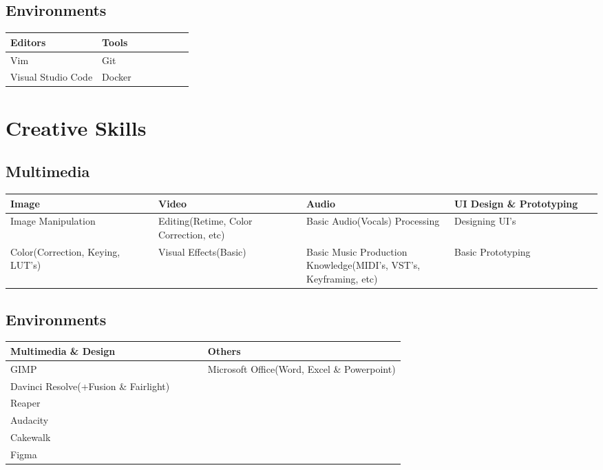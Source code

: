 \documentclass{article}
\newcommand{\quarterwidth}{0.25\linewidth}
\newcommand{\halfwidth}{0.50\linewidth}
\begin{document}
		\subsection{Environments}
			\begin{table}[h!]
				\begin{tabular}[c]{|p{\halfwidth}|p{\halfwidth}|}
					\toprule
					\textbf{Editors}	&	\textbf{Tools}	\\
					\midrule
					Vim					&	Git				\\
					Visual Studio Code	&	Docker			\\
					\bottomrule
				\end{tabular}
			\end{table}

	\section{Creative Skills}
		\subsection{Multimedia}
			\begin{table}[h!]
				\begin{tabular}[c]{|p{\quarterwidth}|p{\quarterwidth}|p{\quarterwidth}|p{\quarterwidth}|}
					\toprule
					\textbf{Image} 						& 	\textbf{Video} 							& \textbf{Audio} 														& \textbf{UI Design \newline\& Prototyping}		\\
					\midrule
					Image Manipulation					&	Editing(Retime, Color Correction, etc)	&	Basic Audio(Vocals) Processing										&	Designing UI's		\\
					Color(Correction, Keying, LUT's)	&   Visual Effects(Basic)					&   Basic Music Production Knowledge(MIDI's, VST's, Keyframing, etc)	&   Basic Prototyping	\\
					\bottomrule
				\end{tabular}
			\end{table}
		\subsection{Environments}
			\begin{table}[h!]
				\begin{tabular}[c]{|p{\halfwidth}|p{\halfwidth}|}
					\toprule
					\textbf{Multimedia \& Design}			& 	\textbf{Others}		\\
					\midrule
					GIMP									&	Microsoft Office(Word, Excel \& Powerpoint) \\
					Davinci Resolve(+Fusion \& Fairlight)	&					\\
					Reaper									&					\\
					Audacity								&					\\
					Cakewalk								&					\\
					Figma									&					\\
					\bottomrule
				\end{tabular}
			\end{table}
	\newpage
\end{document}
